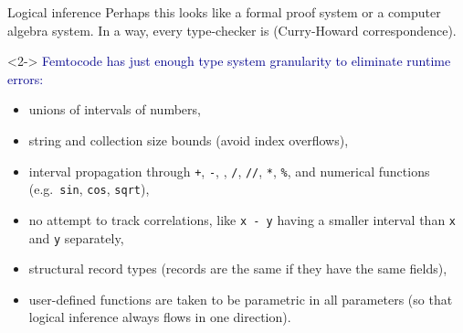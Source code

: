 \documentclass{beamer}
\begin{document}
\begin{frame}{Logical inference}
\vspace{0.25 cm}
Perhaps this looks like a formal proof system or a computer algebra system. In a way, every type-checker is (Curry-Howard correspondence).

\vspace{0.25 cm}
\begin{uncoverenv}<2->
\textcolor{darkblue}{Femtocode has just enough type system granularity to eliminate runtime errors:}
\begin{itemize}
\item unions of intervals of numbers,
\item string and collection size bounds (avoid index overflows),
\item interval propagation through {\tt +}, {\tt -}, {\tt *}, {\tt /}, {\tt //}, {\tt **}, {\tt \%}, and numerical functions (e.g.\ {\tt sin}, {\tt cos}, {\tt sqrt}),
\item no attempt to track correlations, like {\tt x - y} having a smaller interval than {\tt x} and {\tt y} separately,
\item structural record types (records are the same if they have the same fields),
\item user-defined functions are taken to be parametric in all parameters (so that logical inference always flows in one direction).
\end{itemize}
\end{uncoverenv}
\end{frame}
\end{document}

